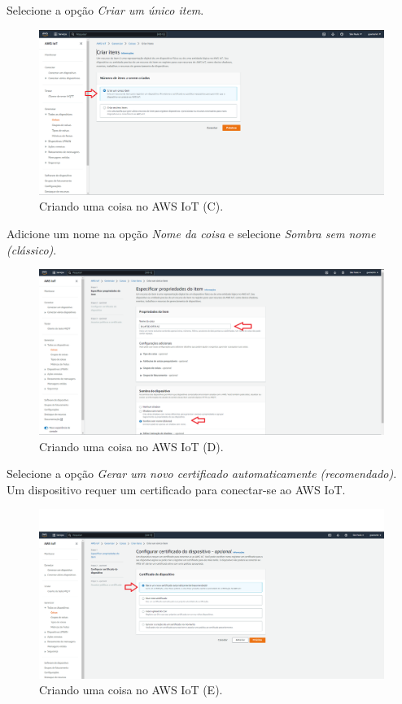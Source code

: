 Selecione a opção \textit{Criar um único item}.

\begin{figure}[H]
    \centering
    \caption{Criando uma coisa no AWS IoT (C).}
    \includegraphics[scale=0.315]{Imagens/criando_uma_coisa_no_aws_iot_2.png}
\end{figure}

Adicione um nome na opção \textit{Nome da coisa} e selecione \textit{Sombra sem nome (clássico)}.

\begin{figure}[H]
    \centering
    \caption{Criando uma coisa no AWS IoT (D).}
    \includegraphics[scale=0.315]{Imagens/criando_uma_coisa_no_aws_iot_3.png}
\end{figure}

Selecione a opção \textit{Gerar um novo certificado automaticamente (recomendado)}. Um dispositivo requer um certificado para conectar-se ao AWS IoT.

\begin{figure}[H]
    \centering
    \caption{Criando uma coisa no AWS IoT (E).}
    \includegraphics[scale=0.315]{Imagens/criando_uma_coisa_no_aws_iot_4.png}
\end{figure}

